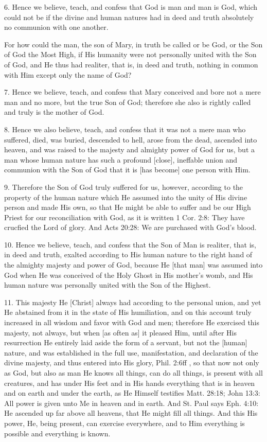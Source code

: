 6. Hence we believe, teach, and confess that God is man and man is God, which could not be if the divine and human natures had in deed and truth absolutely no communion with one another.

For how could the man, the son of Mary, in truth be called or be God, or the Son of God the Most High, if His humanity were not personally united with the Son of God, and He thus had realiter, that is, in deed and truth, nothing in common with Him except only the name of God?

7. Hence we believe, teach, and confess that Mary conceived and bore not a mere man and no more, but the true Son of God; therefore she also is rightly called and truly is the mother of God.

8. Hence we also believe, teach, and confess that it was not a mere man who suffered, died, was buried, descended to hell, arose from the dead, ascended into heaven, and was raised to the majesty and almighty power of God for us, but a man whose human nature has such a profound [close], ineffable union and communion with the Son of God that it is [has become] one person with Him.

9. Therefore the Son of God truly suffered for us, however, according to the property of the human nature which He assumed into the unity of His divine person and made His own, so that He might be able to suffer and be our High Priest for our reconciliation with God, as it is written 1 Cor. 2:8: They have crucfied the Lord of glory. And Acts 20:28: We are purchased with God's blood.

10. Hence we believe, teach, and confess that the Son of Man is realiter, that is, in deed and truth, exalted according to His human nature to the right hand of the almighty majesty and power of God, because He [that man] was assumed into God when He was conceived of the Holy Ghost in His mother's womb, and His human nature was personally united with the Son of the Highest.

11. This majesty He [Christ] always had according to the personal union, and yet He abstained from it in the state of His humiliation, and on this account truly increased in all wisdom and favor with God and men; therefore He exercised this majesty, not always, but when [as often as] it pleased Him, until after His resurrection He entirely laid aside the form of a servant, but not the [human] nature, and was established in the full use, manifestation, and declaration of the divine majesty, and thus entered into His glory, Phil. 2:6ff , so that now not only as God, but also as man He knows all things, can do all things, is present with all creatures, and has under His feet and in His hands everything that is in heaven and on earth and under the earth, as He Himself testifies Matt. 28:18; John 13:3: All power is given unto Me in heaven and in earth. And St. Paul says Eph. 4:10: He ascended up far above all heavens, that He might fill all things. And this His power, He, being present, can exercise everywhere, and to Him everything is possible and everything is known.

